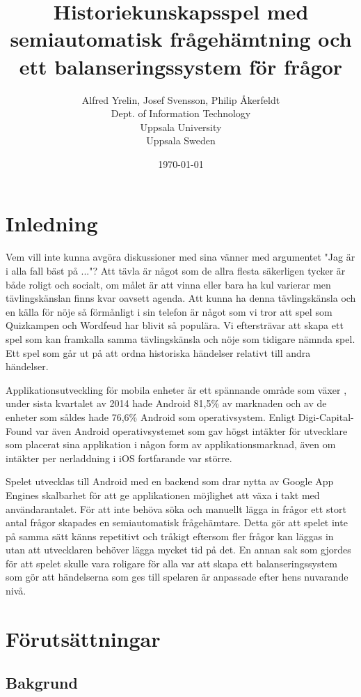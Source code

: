 \documentclass[12pt,a4paper]{article}
\author{Alfred Yrelin, Josef Svensson, Philip Åkerfeldt\\
\textup{Dept. of Information Technology}\\
\textup{Uppsala University}\\
\textup{Uppsala Sweden}\\
}
\title{Historiekunskapsspel med semiautomatisk frågehämtning och ett balanseringssystem för frågor}
\date{\today}
\begin{document}
\maketitle
\newpage
\tableofcontents
\pagebreak

\section{Inledning}
Vem vill inte kunna avgöra diskussioner med sina vänner med argumentet "Jag är i alla fall bäst på ..."? 
Att tävla är något som de allra flesta säkerligen tycker är både roligt och socialt, om målet är att vinna eller bara ha kul varierar men tävlingskänslan finns kvar oavsett agenda. Att kunna ha denna tävlingskänsla och en källa för nöje så förmånligt i sin telefon är något som vi tror att spel som Quizkampen\cite{quiz} och Wordfeud\cite{wordfeud} har blivit så populära. Vi eftersträvar att skapa ett spel som kan framkalla samma tävlingskänsla och nöje som tidigare nämnda spel. Ett spel som går ut på att ordna historiska händelser relativt till andra händelser. 

Applikationsutveckling för mobila enheter är ett spännande område som växer \cite{IDC}, under sista kvartalet av 2014 hade Android 81,5\% av marknaden och av de enheter som såldes hade 76,6\% Android som operativsystem. Enligt Digi-Capital-Found\cite{revenue} var även Android operativsystemet som gav högst intäkter för utvecklare som placerat sina applikation i någon form av applikationsmarknad, även om intäkter per nerladdning i iOS fortfarande var större. 

Spelet utvecklas till Android med en backend som drar nytta av Google App Engines skalbarhet för att ge applikationen möjlighet att växa i takt med användarantalet. För att inte behöva söka och manuellt lägga in frågor ett stort antal frågor skapades en semiautomatisk frågehämtare. Detta gör att spelet inte på samma sätt känns repetitivt och tråkigt eftersom fler frågor kan läggas in utan att utvecklaren behöver lägga mycket tid på det. En annan sak som gjordes för att spelet skulle vara roligare för alla var att skapa ett balanseringssystem som gör att händelserna som ges till spelaren är anpassade efter hens nuvarande nivå.


\section{Förutsättningar}

\subsection{Bakgrund}
\end{document}
